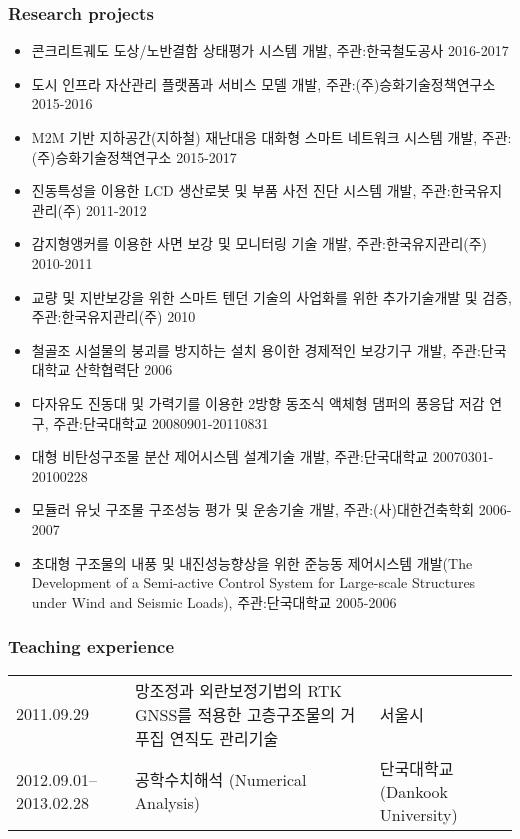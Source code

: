 \subsubsection{Research projects}
\begin{itemize}
\item 콘크리트궤도 도상/노반결함 상태평가 시스템 개발, 주관:한국철도공사 \hfill2016-2017
\item 도시 인프라 자산관리 플랫폼과 서비스 모델 개발, 주관:(주)승화기술정책연구소 \hfill2015-2016
\item M2M 기반 지하공간(지하철) 재난대응 대화형 스마트 네트워크 시스템 개발, 주관:(주)승화기술정책연구소 \hfill2015-2017
\item
  진동특성을 이용한 LCD 생산로봇 및 부품 사전 진단 시스템 개발, 주관:한국유지관리(주) \hfill2011-2012
\item
  감지형앵커를 이용한 사면 보강 및 모니터링 기술 개발,
  주관:한국유지관리(주) \hfill2010-2011
\item
  교량 및 지반보강을 위한 스마트 텐던 기술의 사업화를 위한 추가기술개발
  및 검증, 주관:한국유지관리(주) \hfill2010
\item
  철골조 시설물의 붕괴를 방지하는 설치 용이한 경제적인 보강기구 개발,
  주관:단국대학교 산학협력단 \hfill2006
\item
  다자유도 진동대 및 가력기를 이용한 2방향 동조식 액체형 댐퍼의 풍응답
  저감 연구, 주관:단국대학교 \hfill20080901-20110831
\item
  대형 비탄성구조물 분산 제어시스템 설계기술 개발, 주관:단국대학교
  \hfill20070301-20100228
\item 모듈러 유닛 구조물 구조성능 평가 및 운송기술 개발, 주관:(사)대한건축학회 \hfill2006-2007
\item 초대형 구조물의 내풍 및 내진성능향상을 위한 준능동 제어시스템 개발(The Development of a Semi-active Control System for Large-scale Structures under Wind and Seismic Loads), 주관:단국대학교 \hfill2005-2006
\end{itemize}

\subsubsection*{Teaching experience}

\begin{tabularx}{\textwidth}{p{}XX}
    2011.09.29 & 망조정과 외란보정기법의 RTK GNSS를 적용한 고층구조물의 거푸집 연직도 관리기술 & 서울시 \\
    2012.09.01--2013.02.28 & 공학수치해석 (Numerical Analysis) & 단국대학교 (Dankook University)\\
\end{tabularx}

